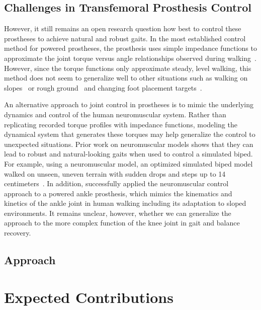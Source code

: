 \subsection{Challenges in Transfemoral Prosthesis Control}
However, it still remains an open research question how best to control these
prostheses to achieve natural and robust gaits. In the most established control
method for powered prostheses, the prosthesis uses simple impedance functions to
approximate the joint torque versus angle relationships observed during
walking~\citep{sup2009preliminary}. However, since the torque functions only
approximate steady, level walking, this method does not seem to generalize well
to other situations such as walking on slopes~\citep{sup2011upslope} or rough
ground~\citep{thatte2016toward} and changing foot placement
targets~\citep{schepelmann2016evaluation}. 

An alternative approach to joint control in prostheses is to mimic the
underlying dynamics and control of the human neuromuscular system. Rather than
replicating recorded torque profiles with impedance functions, modeling the
dynamical system that generates these torques may help generalize the control to
unexpected situations. Prior work on neuromuscular models shows that they can
lead to robust and natural-looking gaits when used to control a simulated biped.
For example, using a neuromuscular model, an optimized simulated biped model
walked on unseen, uneven terrain with sudden drops and steps up to 14
centimeters~\cite{song2015neural}. In addition, \citet{eilenberg2010control}
successfully applied the neuromuscular control approach to a powered ankle
prosthesis, which mimics the kinematics and kinetics of the ankle joint in human
walking including its adaptation to sloped environments. It remains unclear,
however, whether we can generalize the approach to the more complex function of
the knee joint in gait and balance recovery.

\subsection{Approach}
\section{Expected Contributions}

